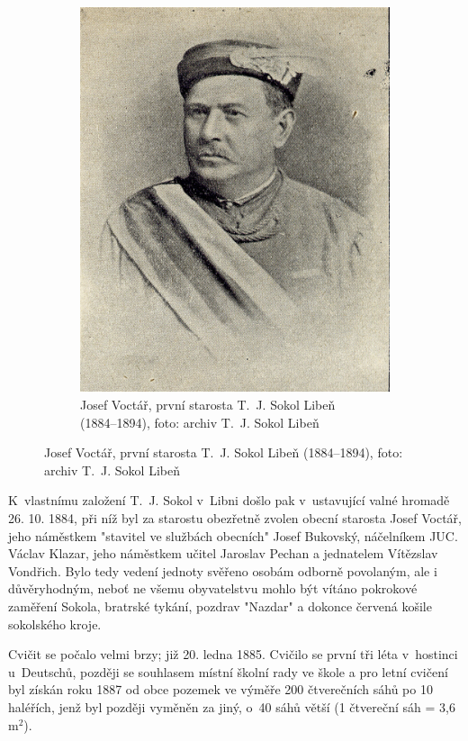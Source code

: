 \documentclass[a5paper, 12pt, twoside]{article}
\begin{document}
\begin{figure}[h]
\begin{subfigure}[c]{0.5\textwidth}
  \includegraphics[width=\textwidth]{img/voctar.jpg}
  \caption*{Josef Voctář, první starosta T.~J. Sokol Libeň (1884–⁠⁠⁠⁠⁠⁠1894), foto: archiv T.~J. Sokol Libeň }
  \end{subfigure}
\end{figure}

K~vlastnímu založení T.~J. Sokol v~Libni došlo pak v~ustavující valné hromadě 26. 10. 1884, při níž byl za starostu obezřetně zvolen obecní starosta Josef Voctář, jeho náměstkem "stavitel ve službách obecních" Josef Bukovský, náčelníkem JUC. Václav Klazar, jeho náměstkem učitel Jaroslav Pechan a jednatelem Vítězslav Vondřich. Bylo tedy vedení jednoty svěřeno osobám odborně povolaným, ale i důvěryhodným, neboť ne všemu obyvatelstvu mohlo být vítáno pokrokové zaměření Sokola, bratrské tykání, pozdrav "Nazdar" a dokonce červená košile sokolského kroje.

Cvičit se počalo velmi brzy; již 20. ledna 1885. Cvičilo se první tři léta v~hostinci u~Deutschů, později se souhlasem místní školní rady ve škole a pro letní cvičení byl získán roku 1887 od obce pozemek ve výměře 200 čtverečních sáhů po 10 haléřích, jenž byl později vyměněn za jiný, o~40 sáhů větší (1 čtvereční sáh = 3,6\,$\textrm{m}^2$).
\end{document}
